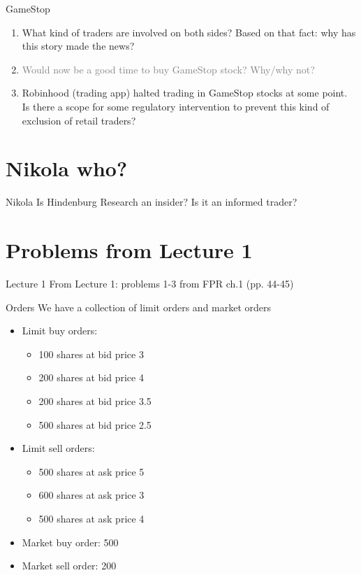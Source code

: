 \documentclass[english,10pt
,aspectratio=169
]{beamer}
\begin{document}
\begin{frame}{GameStop}
	\begin{enumerate}
		\item What kind of traders are involved on both sides? Based on that fact: why has this story made the news?
		\item \textcolor{gray}{Would now be a good time to buy GameStop stock? Why/why not?}
		\item Robinhood (trading app) halted trading in GameStop stocks at some point. Is there a scope for some regulatory intervention to prevent this kind of exclusion of retail traders?
	\end{enumerate}
\end{frame}


\section{Nikola who?}

\begin{frame}{Nikola}
	Is Hindenburg Research an insider? Is it an informed trader? 
\end{frame}



\section{Problems from Lecture 1}

\begin{frame}{Lecture 1}
	From Lecture 1: problems 1-3 from FPR ch.1 (pp. 44-45)
\end{frame}


\begin{frame}{Orders}
	We have a collection of limit orders and market orders
	\begin{itemize}
		\item Limit buy orders:
		\begin{itemize}
			\item 100 shares at bid price 3
			\item 200 shares at bid price 4
			\item 200 shares at bid price 3.5
			\item 500 shares at bid price 2.5
		\end{itemize}
		\item Limit sell orders:
		\begin{itemize}
			\item 500 shares at ask price 5
			\item 600 shares at ask price 3
			\item 500 shares at ask price 4
		\end{itemize}
		\item Market buy order: 500
		\item Market sell order: 200
	\end{itemize}
\end{frame}
\end{document}
